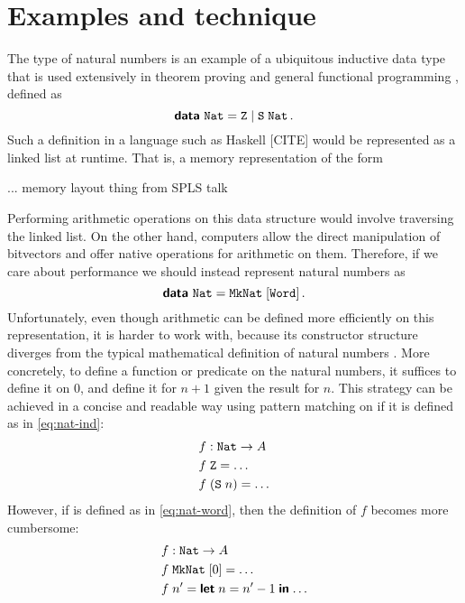 \section{Examples and technique}\label{sec:technique}

The type of natural numbers is an example of a ubiquitous  inductive data type
that is used extensively in theorem proving and general functional programming ,
defined as
\begin{equation}\label{eq:nat-ind}
  \textsf{\textbf{data}}\ \texttt{Nat} = \texttt{Z} \mid \texttt{S}\;\texttt{Nat} \,.
\end{equation}
Such a definition in a language such as Haskell [CITE] would be represented as
a linked list at runtime. That is, a memory representation of the form 

... memory layout thing from SPLS talk

Performing arithmetic operations on this data structure would involve
traversing the linked list. On the other hand, computers allow the direct
manipulation of bitvectors and offer native operations for arithmetic on them.
Therefore, if we care about performance we should instead represent natural
numbers as
\begin{equation}\label{eq:nat-word}
  \textsf{\textbf{data}}\ \texttt{Nat} = \texttt{MkNat} \; [\texttt{Word}] \,.
\end{equation} 
Unfortunately, even though arithmetic can be defined more efficiently on this
representation, it is harder to work with, because its constructor structure
diverges from the typical mathematical definition of natural numbers . More
concretely, to define a function or predicate on the natural numbers, it
suffices to define it on 0, and define it for $n + 1$ given the result for $n$.
This strategy can be achieved in a concise and readable way using pattern
matching on  if it is defined as in \eqref{eq:nat-ind}:
\begin{align*}
   & f : \texttt{Nat} \to A        \\
   & f\; \texttt{Z} = \ldots       \\
   & f\; (\texttt{S}\; n) = \ldots
\end{align*}
However, if  is defined as in \eqref{eq:nat-word}, then the
definition of $f$ becomes more cumbersome:
\begin{align*}
   & f : \texttt{Nat} \to A              \\
   & f\; \texttt{MkNat} \; [0] = \ldots  \\
   & f\; n' = \textsf{\textbf{let}}\; {n} = {n' - 1}\; \textsf{\textbf{in}}\; {\ldots}
\end{align*} 

